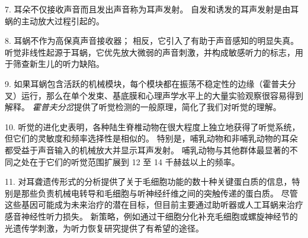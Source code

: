 7. 耳朵不仅接收声音而且发出声音称为耳声发射。
自发和诱发的耳声发射是由耳蜗的主动放大过程引起的。 


8. 耳蜗不作为高保真声音接收器；
相反，它引入了有助于声音感知的明显失真。
听觉非线性起源于耳蜗，它优先放大微弱的声音刺激，并构成敏感听力的标志，用于筛查新生儿的听力缺陷。


9. 如果耳蜗包含活跃的机械模块，每个模块都在振荡不稳定性的边缘（霍普夫分叉）运行，那么在单个发束、基底膜和心理声学水平上的大量实验观察很容易得到解释。
\textit{霍普夫分岔}提供了听觉检测的一般原理，简化了我们对听觉的理解。


10. 听觉的进化史表明，各种陆生脊椎动物在很大程度上独立地获得了听觉系统，但它们的灵敏度和频率选择性是相似的。
特别是，哺乳动物和非哺乳动物的耳朵都受益于声音输入的机械放大并显示耳声发射。
哺乳动物与其他群体最显著的不同之处在于它们的听觉范围扩展到 12 至 14 千赫兹以上的频率。


11. 对耳聋遗传形式的分析提供了关于毛细胞功能的数十种关键蛋白质的信息，特别是那些负责机械电转导和毛细胞与听神经纤维之间的突触传递的蛋白质。
尽管这些基因可能成为未来治疗的潜在目标，但目前主要通过助听器或人工耳蜗来治疗感音神经性听力损失。
新策略，例如通过干细胞分化补充毛细胞或螺旋神经节的光遗传学刺激，为听力恢复研究提供了有希望的途径。


